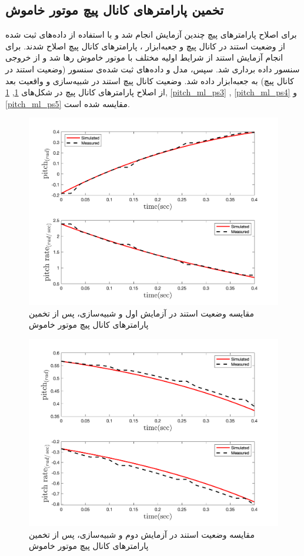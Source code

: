 \subsection{تخمین پارامترهای کانال پیچ موتور خاموش}
برای اصلاح پارامترهای پیچ چندین آزمایش انجام شد و با استفاده از داده‌های ثبت شده از وضعیت استند در کانال پیچ و جعبه‌ابزار
،
پارامترهای کانال پیچ اصلاح شدند.
برای انجام آزمایش استند از شرایط اولیه مختلف با موتور خاموش رها شد  و از خروجی سنسور داده برداری شد. سپس، مدل و داده‌های ثبت شده‌ی سنسور (وضعیت استند در کانال پیچ) به جعبه‌ابزار
داده شد. وضعیت کانال پیچ استند در شبیه‌سازی و واقعیت بعد از اصلاح پارامترهای کانال پیچ در شکل‌های
\ref{pitch_ml_ps1}, \ref{pitch_ml_ps1}, \ref{pitch_ml_ps3} , \ref{pitch_ml_ps4}  و \ref{pitch_ml_ps5}
مقایسه شده است.

\begin{figure}[H]
	\includegraphics[width=12cm]{../../Figures/RCP/pitch_ml_parameter_estimation/RCP_pitch_S1.png}
	\centering
	\caption{مقايسه وضعیت استند در  آزمايش اول و شبیه‌سازی، پس از تخمین پارامترهای کانال پیچ موتور خاموش}
	\label{pitch_ml_ps1}
\end{figure}
\begin{figure}[H]
	\includegraphics[width=12cm]{../../Figures/RCP/pitch_ml_parameter_estimation/RCP_pitch_S2.png}
	\centering
	\caption{مقايسه وضعیت استند در  آزمايش دوم و شبیه‌سازی، پس از تخمین پارامترهای کانال پیچ موتور خاموش}
	\label{pitch_ml_ps2}
\end{figure}
